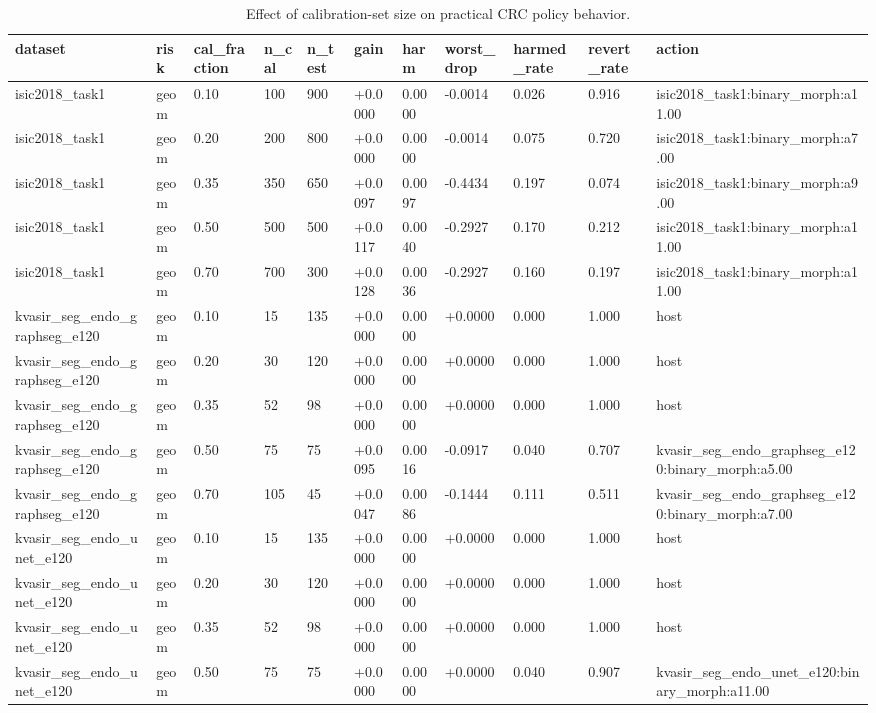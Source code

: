 \begin{table}[t]
\centering
\small
\caption{Effect of calibration-set size on practical CRC policy behavior.}
\label{tab:calibration_fraction_sweep}
\begin{tabular}{lllllllllll}
\toprule
dataset & risk & cal\_fraction & n\_cal & n\_test & gain & harm & worst\_drop & harmed\_rate & revert\_rate & action \\
\midrule
isic2018\_task1 & geom & 0.10 & 100 & 900 & +0.0000 & 0.0000 & -0.0014 & 0.026 & 0.916 & isic2018\_task1:binary\_morph:a11.00 \\
isic2018\_task1 & geom & 0.20 & 200 & 800 & +0.0000 & 0.0000 & -0.0014 & 0.075 & 0.720 & isic2018\_task1:binary\_morph:a7.00 \\
isic2018\_task1 & geom & 0.35 & 350 & 650 & +0.0097 & 0.0097 & -0.4434 & 0.197 & 0.074 & isic2018\_task1:binary\_morph:a9.00 \\
isic2018\_task1 & geom & 0.50 & 500 & 500 & +0.0117 & 0.0040 & -0.2927 & 0.170 & 0.212 & isic2018\_task1:binary\_morph:a11.00 \\
isic2018\_task1 & geom & 0.70 & 700 & 300 & +0.0128 & 0.0036 & -0.2927 & 0.160 & 0.197 & isic2018\_task1:binary\_morph:a11.00 \\
kvasir\_seg\_endo\_graphseg\_e120 & geom & 0.10 & 15 & 135 & +0.0000 & 0.0000 & +0.0000 & 0.000 & 1.000 & host \\
kvasir\_seg\_endo\_graphseg\_e120 & geom & 0.20 & 30 & 120 & +0.0000 & 0.0000 & +0.0000 & 0.000 & 1.000 & host \\
kvasir\_seg\_endo\_graphseg\_e120 & geom & 0.35 & 52 & 98 & +0.0000 & 0.0000 & +0.0000 & 0.000 & 1.000 & host \\
kvasir\_seg\_endo\_graphseg\_e120 & geom & 0.50 & 75 & 75 & +0.0095 & 0.0016 & -0.0917 & 0.040 & 0.707 & kvasir\_seg\_endo\_graphseg\_e120:binary\_morph:a5.00 \\
kvasir\_seg\_endo\_graphseg\_e120 & geom & 0.70 & 105 & 45 & +0.0047 & 0.0086 & -0.1444 & 0.111 & 0.511 & kvasir\_seg\_endo\_graphseg\_e120:binary\_morph:a7.00 \\
kvasir\_seg\_endo\_unet\_e120 & geom & 0.10 & 15 & 135 & +0.0000 & 0.0000 & +0.0000 & 0.000 & 1.000 & host \\
kvasir\_seg\_endo\_unet\_e120 & geom & 0.20 & 30 & 120 & +0.0000 & 0.0000 & +0.0000 & 0.000 & 1.000 & host \\
kvasir\_seg\_endo\_unet\_e120 & geom & 0.35 & 52 & 98 & +0.0000 & 0.0000 & +0.0000 & 0.000 & 1.000 & host \\
kvasir\_seg\_endo\_unet\_e120 & geom & 0.50 & 75 & 75 & +0.0000 & 0.0000 & +0.0000 & 0.040 & 0.907 & kvasir\_seg\_endo\_unet\_e120:binary\_morph:a11.00 \\

\end{tabular}
\end{table}
